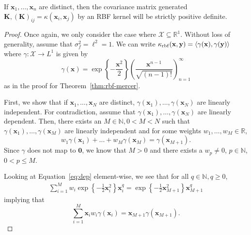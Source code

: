 \begin{lemma}
    \label{lem:rbf-pd}
    If $\mathbf{x}_1, \dots, \mathbf{x}_n$ are distinct, then the covariance matrix generated $\mathbf{K}, (\mathbf{K})_{ij} = \kappa(\mathbf{x}_i, \mathbf{x}_j)$ by an RBF kernel will be strictly positive definite.
\end{lemma}
\begin{proof}
    Once again, we only consider the case where $\mathcal{X} \subseteq \mathbb{R}^{1}$.
    Without loss of generality, assume that $\sigma_f^2 = \ell^2 = 1$.
    We can write $\kappa_{\mathrm{rbf}}(\mathbf{x}, \mathbf{y}) = \langle \gamma(\mathbf{x}), \gamma(\mathbf{y}) \rangle$
    where $\gamma: \mathcal{X} \to L^{1}$ is given by
    \begin{equation*}
        \gamma(\mathbf{x}) = \exp\left\{-\frac{\mathbf{x}^2}2 \right\} \left(\frac{ \mathbf{x}^{n - 1} }{ \sqrt{(n - 1)!} }\right)_{n=1}^{\infty}
    \end{equation*}
    as in the proof for Theorem~\ref{thm:rbf-mercer}.

    First, we show that if $\mathbf{x}_1, \dots, \mathbf{x}_N$ are distinct, $\gamma(\mathbf{x}_1), \dots, \gamma(\mathbf{x}_N)$ are linearly independent.
    For contradiction, assume that $\gamma(\mathbf{x}_1), \dots, \gamma(\mathbf{x}_N)$ are linearly dependent.
    Then, there exists an $M \in \mathbb{N}, 0 < M < N$ such that $\gamma(\mathbf{x}_1), \dots, \gamma(\mathbf{x}_M)$
    are linearly independent and for some weights $w_1, \dots, w_M \in \mathbb{R}$,
    \begin{equation}
        \label{eq:dep}
        w_1 \gamma(\mathbf{x}_1) + \dots + w_M \gamma(\mathbf{x}_M) = \gamma(\mathbf{x}_{M + 1}).
    \end{equation}
    Since $\gamma$ does not map to $\mathbf{0}$, we know that $M > 0$ and there exists a $w_p \neq 0$, $p \in \mathbb{N}$, $0 < p \leq M$.

    Looking at Equation~\ref{eq:dep} element-wise, we see that for all $q \in \mathbb{N}, q \geq 0$,
    \begin{align*}
        \sum\limits_{i = 1}^{M} w_i \exp \left\{ -\frac12 \mathbf{x}_i^2 \right\} \mathbf{x}_i^{q}
        = \exp \left\{ -\frac12 \mathbf{x}_{M + 1}^2 \right\} \mathbf{x}_{M+1}^{q}
    \end{align*}
    implying that
    \begin{equation*}
        \sum\limits_{i=1}^{M} \mathbf{x}_i w_i \gamma(\mathbf{x}_i)  = \mathbf{x}_{M + 1} \gamma(\mathbf{x}_{M + 1}).
    \end{equation*}


\end{proof}
